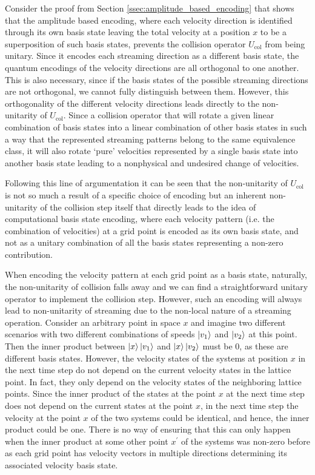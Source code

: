 Consider the proof from Section \ref{ssec:amplitude_based_encoding} that shows that the amplitude based encoding, where each velocity direction is identified through its own basis state leaving the total velocity at a position $x$ to be a superposition of such basis states, prevents the collision operator $U_\text{col}$ from being unitary. Since it encodes each streaming direction as a different basis state, the quantum encodings of the velocity directions are all orthogonal to one another. This is also necessary, since if the basis states of the possible streaming directions are not orthogonal, we cannot fully distinguish between them. However, this orthogonality of the different velocity directions leads directly to the non-unitarity of $U_\text{col}$. Since a collision operator that will rotate a given linear combination of basis states into a linear combination of other basis states in such a way that the represented streaming patterns belong to the same equivalence class, it will also rotate `pure' velocities represented by a single basis state into another basis state leading to a nonphysical and undesired change of velocities. 

Following this line of argumentation it can be seen that the non-unitarity of $U_\text{col}$ is not so much a result of a specific choice of encoding but an inherent non-unitarity of the collision step itself that directly leads to the idea of computational basis state encoding, where each velocity pattern (i.e. the combination of velocities) at a grid point is encoded as its own basis state, and not as a unitary combination of all the basis states representing a non-zero contribution.

When encoding the velocity pattern at each grid point as a basis state, naturally, the non-unitarity of collision falls away and we can find a straightforward unitary operator to implement the collision step.
However, such an encoding will always lead to non-unitarity of streaming due to the non-local nature of a streaming operation. Consider an arbitrary point in space $x$ and imagine two different scenarios with two different combinations of speeds $\ket{v_1}$ and $\ket{v_2}$ at this point. Then the inner product between $\ket{x}\ket{v_1}$ and $\ket{x}\ket{v_2}$ must be 0, as these are different basis states. However, the velocity states of the systems at position $x$ in the next time step do not depend on the current velocity states in the lattice point. In fact, they only depend on the velocity states of the neighboring lattice points. Since the inner product of the states at the point $x$ at the next time step does not depend on the current states at the point $x$, in the next time step the velocity at the point $x$ of the two systems could be identical, and hence, the inner product could be one. There is no way of ensuring that this can only happen when the inner product at some other point $x^\prime$ of the systems was non-zero before as each grid point has velocity vectors in multiple directions determining its associated velocity basis state. 


